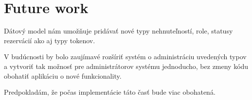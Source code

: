 \section{Future work}
Dátový model nám umožňuje pridávať nové typy nehnuteľností, role, statusy rezervácií ako aj typy tokenov.

V budúcnosti by bolo zaujímavé rozšíriť systém o administráciu uvedených typov a vytvoriť tak možnosť pre administrátorov systému jednoducho, bez zmeny kódu obohatiť aplikáciu o nové funkcionality.

Predpokladám, že počas implementácie táto časť bude viac obohatená.